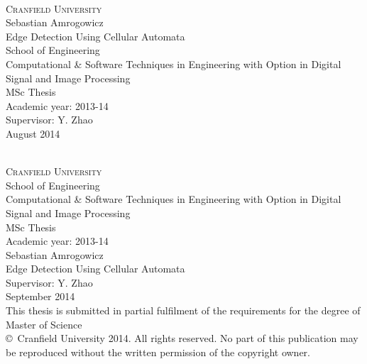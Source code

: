 \newcommand{\lent}[2]{\textsc{\LARGE #1} \\[#2]}
\begin{titlepage}

\begin{center}
~\\[1cm]
\lent{Cranfield University}{2cm}

\Large{Sebastian Amrogowicz}\\[2cm]

\Large{Edge Detection Using Cellular Automata}\\[3cm]

\Large{School of Engineering}\\[0.3cm]
\Large{Computational \& Software Techniques in Engineering with Option in Digital Signal and Image Processing}\\[2cm]

\Large{MSc Thesis} \\
\Large{Academic year: 2013-14}\\[2cm]

\Large{Supervisor: Y. Zhao}\\
\Large{August 2014}

\end{center}
\cleardoublepage

\begin{center}
~\\[1cm]
\lent{Cranfield University}{1.5cm}
\Large{School of Engineering}\\[0.3cm]
\Large{Computational \& Software Techniques in Engineering with Option in Digital Signal and Image Processing}\\[1cm]

\Large{MSc Thesis}\\[1cm]
\Large{Academic year: 2013-14}\\[1cm]

\Large{Sebastian Amrogowicz}\\[1cm]
\Large{Edge Detection Using Cellular Automata}\\[1cm]

\Large{Supervisor: Y. Zhao}\\
\Large{September 2014}\\[1cm]

\large{This thesis is submitted in partial fulfilment of the requirements for the degree of Master of Science}\\[0.5cm]

\large{\copyright\, Cranfield University 2014. All rights reserved. No part of this publication may be reproduced without the written permission of the copyright owner.}
\end{center}
\cleardoublepage
\end{titlepage}